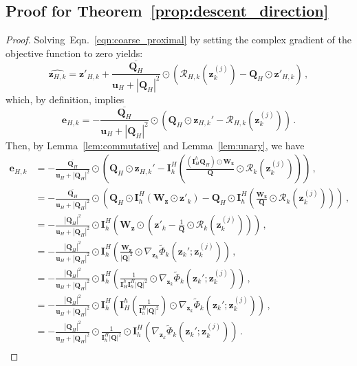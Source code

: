 \documentclass{article}
\numberwithin{equation}{section}
\begin{document}
\subsection{Proof for Theorem~\ref{prop:descent_direction}}\label{app:proof_coarse_grid_update}
    \begin{proof}
Solving~Eqn.~\ref{eqn:coarse_proximal} by setting the complex gradient of the objective function to zero yields:
\begin{equation*}
    \widehat{\bm{z}_{H,k}} = \bm{z}'_{H,k} + \frac{\overline{\bm{Q}_H}}{\bm{u}_H + |\bm{Q}_H|^2}\odot\left(\mathcal{R}_{H,k}\left(\bm{z}_k^{(j)}\right) - \bm{Q}_H\odot\bm{z}'_{H,k}\right)\,,
\end{equation*}
which, by definition, implies
\begin{equation*}
    \bm{e}_{H,k} = -\frac{\overline{\bm{Q}_H}}{\bm{u}_H + |\bm{Q}_H|^2}\odot\left(\bm{Q}_H\odot\bm{z}_{H,k}' - \mathcal{R}_{H,k}\left(\bm{z}_k^{(j)}\right)\right)\,.
\end{equation*}
Then, by Lemma~\ref{lem:commutative} and Lemma~\ref{lem:unary}, we have
\begin{equation*}
        \begin{aligned}
            \bm{e}_{H,k} &= -\frac{\overline{\bm{Q}_H}}{\bm{u}_H + |\bm{Q}_H|^2}\odot\left(\bm{Q}_H\odot\bm{z}_{H,k}' - \bm{I}_h^H\left(\frac{(\bm{I}_H^h\bm{Q}_H )\odot\bm{W}_{\bm{z}}}{\bm{Q}}\odot\mathcal{R}_k\left(\bm{z}_k^{(j)}\right)\right)\right)\,,\\
            &=-\frac{\overline{\bm{Q}_H}}{\bm{u}_H+|\bm{Q}_H|^2}\odot\left(  \bm{Q}_H\odot\bm{I}_h^H(\bm{W}_{\bm{z}}\odot\bm{z}'_{k})-\bm{Q}_H \odot\bm{I}_h^H\left(\frac{\bm{W}_{\bm{z}}}{\bm{Q}}\odot\mathcal{R}_k\left(\bm{z}_k^{(j)}\right)\right)\right)\,,\\
            &=-\frac{|\bm{Q}_H|^2}{\bm{u}_H+|\bm{Q}_H|^2}\odot\bm{I}_h^H\left(\bm{W}_{\bm{z}}\odot\left(\bm{z}'_{k}-\frac{1}{\bm{Q}}\odot\mathcal{R}_k\left(\bm{z}_k^{(j)}\right)\right)\right)\,,\\
            &= -\frac{|\bm{Q}_H|^2}{\bm{u}_H+|\bm{Q}_H|^2}\odot\bm{I}_h^H\left(\frac{\bm{W}_{\bm{z}}}{|\bm{Q}|^2}\odot\nabla_{\bm{z}_k}\widetilde{\Phi}_k\left(\bm{z}_k'; \bm{z}_k^{(j)}\right)\right)\,,\\
            &=-\frac{|\bm{Q}_H|^2}{\bm{u}_H+|\bm{Q}_H|^2}\odot\bm{I}_h^H\left(\frac{1}{\bm{I}_H^h\bm{I}_h^H|\bm{Q}|^2}\odot\nabla_{\bm{z}_k}\widetilde{\Phi}_k\left(\bm{z}_k'; \bm{z}_k^{(j)}\right)\right)
        \,,\\
        &=-\frac{|\bm{Q}_H|^2}{\bm{u}_H+|\bm{Q}_H|^2}\odot\bm{I}_h^H\left(\bm{I}_H^h\left(\frac{1}{\bm{I}_h^H|\bm{Q}|^2}\right)\odot\nabla_{\bm{z}_k}\widetilde{\Phi}_k\left(\bm{z}_k'; \bm{z}_k^{(j)}\right)\right)
        \,,\\
        &=-\frac{|\bm{Q}_H|^2}{\bm{u}_H+|\bm{Q}_H|^2}\odot\frac{1}{\bm{I}_h^H|\bm{Q}|^2}\odot\bm{I}_h^H\left(\nabla_{\bm{z}_k}\widetilde{\Phi}_k\left(\bm{z}_k'; \bm{z}_k^{(j)}\right)\right)
        \,.\\
        \end{aligned}
    \end{equation*}
    


\end{proof}
\end{document}

